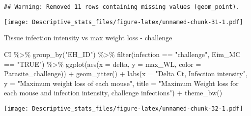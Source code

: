 \documentclass[
]{article}
\newenvironment{Shaded}{\begin{snugshade}}{\end{snugshade}}
\newcommand{\AttributeTok}[1]{\textcolor[rgb]{0.77,0.63,0.00}{#1}}
\newcommand{\FunctionTok}[1]{\textcolor[rgb]{0.00,0.00,0.00}{#1}}
\newcommand{\NormalTok}[1]{#1}
\newcommand{\SpecialCharTok}[1]{\textcolor[rgb]{0.00,0.00,0.00}{#1}}
\newcommand{\StringTok}[1]{\textcolor[rgb]{0.31,0.60,0.02}{#1}}
\begin{document}
\begin{verbatim}
## Warning: Removed 11 rows containing missing values (geom_point).
\end{verbatim}

\texttt{[image: Descriptive\_stats\_files/figure-latex/unnamed-chunk-31-1.pdf]}

Tissue infection intensity vs max weight loss - challenge

\begin{Shaded}
\begin{Highlighting}[]
\NormalTok{CI  }\SpecialCharTok{\%\textgreater{}\%}
  \FunctionTok{group\_by}\NormalTok{(}\StringTok{"EH\_ID"}\NormalTok{) }\SpecialCharTok{\%\textgreater{}\%}
  \FunctionTok{filter}\NormalTok{(infection }\SpecialCharTok{==} \StringTok{"challenge"}\NormalTok{, Eim\_MC }\SpecialCharTok{==} \StringTok{"TRUE"}\NormalTok{) }\SpecialCharTok{\%\textgreater{}\%}
  \FunctionTok{ggplot}\NormalTok{(}\FunctionTok{aes}\NormalTok{(}\AttributeTok{x =}\NormalTok{ delta, }\AttributeTok{y =}\NormalTok{ max\_WL, }\AttributeTok{color =}\NormalTok{ Parasite\_challenge)) }\SpecialCharTok{+}
  \FunctionTok{geom\_jitter}\NormalTok{() }\SpecialCharTok{+}
  \FunctionTok{labs}\NormalTok{(}\AttributeTok{x =} \StringTok{"Delta Ct, Infection intensity"}\NormalTok{, }\AttributeTok{y =} \StringTok{"Maximum weight loss of each mouse"}\NormalTok{,}
       \AttributeTok{title =} \StringTok{"Maximum Weight loss for each mouse and infection intensity, }
\StringTok{       challenge infections"}\NormalTok{) }\SpecialCharTok{+}
    \FunctionTok{theme\_bw}\NormalTok{()}
\end{Highlighting}
\end{Shaded}

\texttt{[image: Descriptive\_stats\_files/figure-latex/unnamed-chunk-32-1.pdf]}
\end{document}
